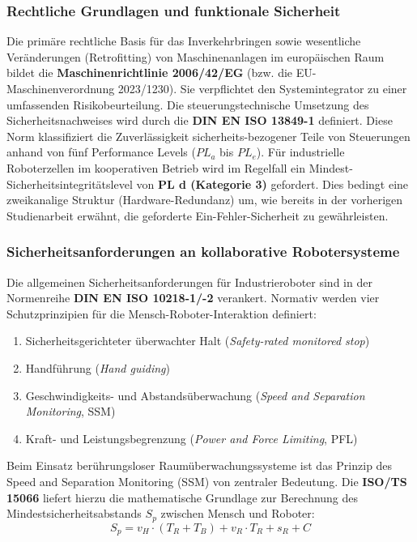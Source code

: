 \subsubsection{Rechtliche Grundlagen und funktionale Sicherheit}
Die primäre rechtliche Basis für das Inverkehrbringen sowie wesentliche Veränderungen (Retrofitting) von Maschinenanlagen im europäischen Raum bildet die \textbf{Maschinenrichtlinie 2006/42/EG}\cite{maschinenrichtlinie_2006} (bzw. die EU-Maschinenverordnung 2023/1230)\cite{maschinenverordnung_2023}. Sie verpflichtet den Systemintegrator zu einer umfassenden Risikobeurteilung. Die steuerungstechnische Umsetzung des Sicherheitsnachweises wird durch die \textbf{DIN EN ISO 13849-1} \cite{din13849_1_2023} definiert. Diese Norm klassifiziert die Zuverlässigkeit sicherheits-bezogener Teile von Steuerungen anhand von fünf Performance Levels ($PL_a$ bis $PL_e$). Für industrielle Roboterzellen im kooperativen Betrieb wird im Regelfall ein Mindest-Sicherheitsintegritätslevel von \textbf{PL d (Kategorie 3)} gefordert. Dies bedingt eine zweikanalige Struktur (Hardware-Redundanz) um, wie bereits in der vorherigen Studienarbeit erwähnt, die geforderte Ein-Fehler-Sicherheit zu gewährleisten.
\newpage
\subsubsection{Sicherheitsanforderungen an kollaborative Robotersysteme}
Die allgemeinen Sicherheitsanforderungen für Industrieroboter sind in der Normenreihe \textbf{DIN EN ISO 10218-1/-2} \cite{din10218_1_2012} \cite{din10218_2_2012} verankert. Normativ werden vier Schutzprinzipien für die Mensch-Roboter-Interaktion definiert:
\begin{enumerate}
	\item Sicherheitsgerichteter überwachter Halt (\textit{Safety-rated monitored stop})
	\item Handführung (\textit{Hand guiding})
	\item Geschwindigkeits- und Abstandsüberwachung (\textit{Speed and Separation Monitoring}, SSM)
	\item Kraft- und Leistungsbegrenzung (\textit{Power and Force Limiting}, PFL)
\end{enumerate}
Beim Einsatz berührungsloser Raumüberwachungssysteme ist das Prinzip des Speed and Separation Monitoring (SSM) von zentraler Bedeutung. Die \textbf{ISO/TS 15066} \cite{din_ts_15066_2017} liefert hierzu die mathematische Grundlage zur Berechnung des Mindestsicherheitsabstands $S_p$ zwischen Mensch und Roboter:
\begin{equation}
	S_p = v_H \cdot (T_R + T_B) + v_R \cdot T_R + s_R + C
	\label{Mindestsicherheitsabstand in kollaborativen Systemen}
\end{equation}

